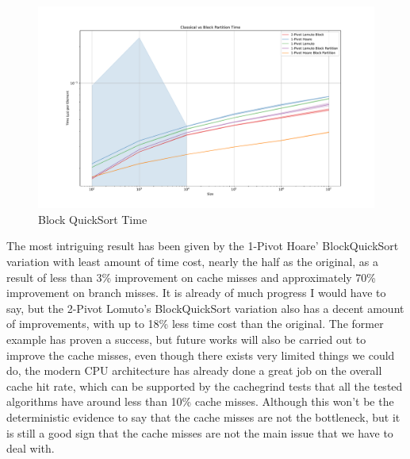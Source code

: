 \documentclass{article}
\begin{document}
\begin{figure}[H]
    \hypertarget{fig:blocktime}{}
    \caption{Block QuickSort Time}
    \centering
    \hspace*{-0.27\textwidth}
    \includegraphics[width=1.5\textwidth]{Classical vs Block Partition Time.pdf}
\end{figure}

The most intriguing result has been given by the 1-Pivot Hoare' BlockQuickSort variation with least amount of time cost, nearly the half as the original, as a result of less than 3\% improvement on cache misses and approximately 70\% improvement on branch misses.
It is already of much progress I would have to say, but the 2-Pivot Lomuto's BlockQuickSort variation also has a decent amount of improvements, with up to 18\% less time cost than the original.
The former example has proven a success, but future works will also be carried out to improve the cache misses, even though there exists very limited things we could do,
the modern CPU architecture has already done a great job on the overall cache hit rate, which can be supported by the cachegrind tests that all the tested algorithms have around less than 10\% cache misses.
Although this won't be the deterministic evidence to say that the cache misses are not the bottleneck, but it is still a good sign that the cache misses are not the main issue that we have to deal with.


\end{document}
